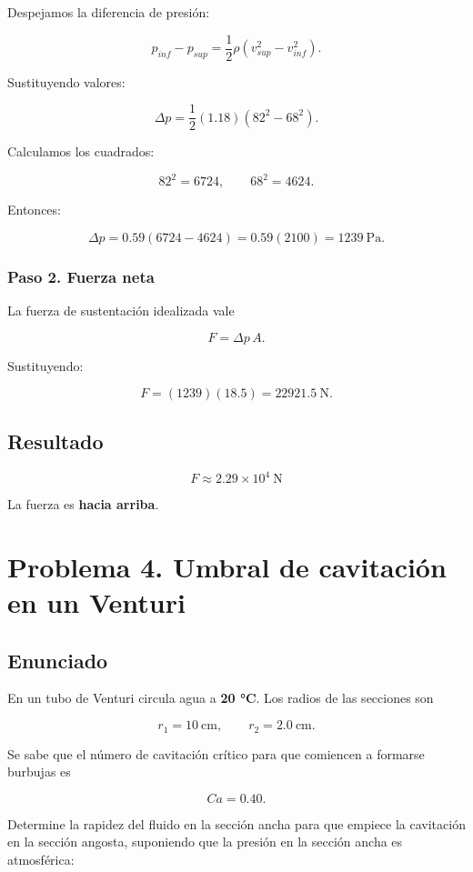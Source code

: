 \documentclass[
  letterpaper,
  DIV=11,
  numbers=noendperiod]{scrreprt}
\begin{document}
Despejamos la diferencia de presión:

\[
p_{inf}-p_{sup} = \frac12\rho\left(v_{sup}^2-v_{inf}^2\right).
\]

Sustituyendo valores:

\[
\Delta p = \frac12(1.18)\left(82^2-68^2\right).
\]

Calculamos los cuadrados:

\[
82^2=6724,
\qquad
68^2=4624.
\]

Entonces:

\[
\Delta p = 0.59(6724-4624)=0.59(2100)=1239\ \text{Pa}.
\]

\subsection{Paso 2. Fuerza neta}\label{paso-2.-fuerza-neta}

La fuerza de sustentación idealizada vale

\[
F = \Delta p\,A.
\]

Sustituyendo:

\[
F=(1239)(18.5)=22921.5\ \text{N}.
\]

\section{Resultado}\label{resultado-1}

\[
\boxed{F\approx 2.29\times10^4\ \text{N}}
\]

La fuerza es \textbf{hacia arriba}.

\chapter{Problema 4. Umbral de cavitación en un
Venturi}\label{problema-4.-umbral-de-cavitaciuxf3n-en-un-venturi}

\section{Enunciado}\label{enunciado-3}

En un tubo de Venturi circula agua a \textbf{20 °C}. Los radios de las
secciones son

\[
r_1=10\ \text{cm}, \qquad r_2=2.0\ \text{cm}.
\]

Se sabe que el número de cavitación crítico para que comiencen a
formarse burbujas es

\[
Ca=0.40.
\]

Determine la rapidez del fluido en la sección ancha para que empiece la
cavitación en la sección angosta, suponiendo que la presión en la
sección ancha es atmosférica:
\end{document}
